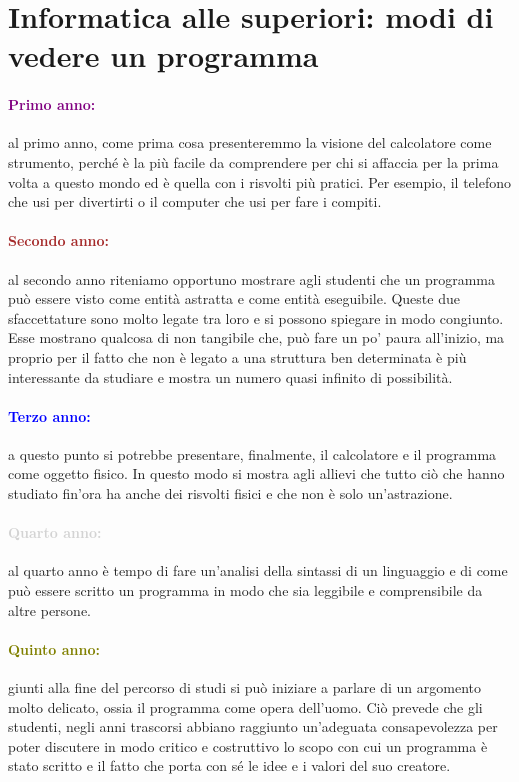 \section{Informatica alle superiori: modi di vedere un programma}

\paragraph{\textcolor{purple}{Primo anno:}} al primo anno, come prima cosa
presenteremmo la visione del calcolatore come strumento, perché è la più facile da comprendere
per chi si affaccia per la prima volta a questo mondo ed è quella con i risvolti
più pratici. Per esempio, il telefono che usi per divertirti o il computer che usi
per fare i compiti.

\paragraph{\textcolor{brown}{Secondo anno:}} al secondo anno riteniamo opportuno
mostrare agli studenti che un programma può essere visto come entità astratta e
come entità eseguibile. Queste due sfaccettature sono molto legate tra loro e
si possono spiegare in modo congiunto. Esse mostrano qualcosa di non tangibile che,
può fare un po' paura all'inizio, ma proprio per il fatto che non è legato a una struttura
ben determinata è più interessante da studiare e mostra un numero quasi infinito di
possibilità. 

\paragraph{\textcolor{blue}{Terzo anno:}} a questo punto si potrebbe presentare,
finalmente, il calcolatore e il programma come oggetto fisico. In questo modo
si mostra agli allievi che tutto ciò che hanno studiato fin'ora ha anche dei risvolti
fisici e che non è solo un'astrazione.
 
\paragraph{\textcolor{lightgray}{Quarto anno:}} al quarto anno è tempo di
fare un'analisi della sintassi di un linguaggio e di come può essere scritto
un programma in modo che sia leggibile e comprensibile da altre persone.

\paragraph{\textcolor{olive}{Quinto anno:}} giunti alla fine del percorso
di studi si può iniziare a parlare di un argomento molto delicato, ossia
il programma come opera dell'uomo. Ciò prevede che gli studenti, negli anni
trascorsi abbiano raggiunto un'adeguata consapevolezza per poter discutere in
modo critico e costruttivo lo scopo con cui un programma è stato scritto e
il fatto che porta con sé le idee e i valori del suo creatore.
